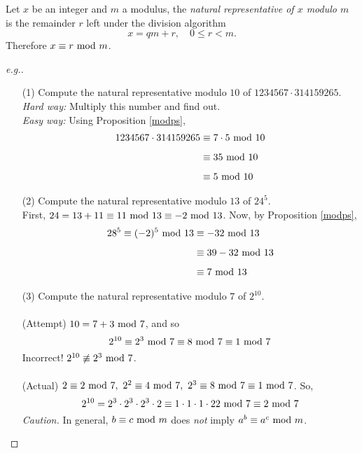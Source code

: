 \begin{definition}
Let $x$ be an integer and $m$ a modulus, the \emph{natural representative of $x$ modulo $m$} is the remainder $r$ left under the division algorithm
\[x = qm + r,\quad 0 \leq r < m.\]
Therefore $x \equiv r\text{ mod }{m}$.
\end{definition}
\begin{proof}[e.g.]\renewcommand{\qedsymbol}{}
\begin{itemize}
\item[(1)] Compute the natural representative modulo $10$ of $1234567 \cdot 314159265$.\\[0.5em]
\hspace*{1.9em}\emph{Hard way:} Multiply this number and find out.\\[0.5em]
\hspace*{1.9em}\emph{Easy way:} Using Proposition \ref{modps},
\begin{align*}
1234567 \cdot 314159265 &\equiv 7\cdot 5\text{ mod }{10}\\[0.5em]
&\equiv 35\text{ mod }{10}\\[0.5em]
&\equiv 5\text{ mod }{10}
\end{align*}
\end{itemize}
\begin{itemize}[leftmargin=4.4em]
\item[(2)] Compute the natural representative modulo $13$ of $24^5$.\\[0.5em]
First, $24 = 13 + 11 \equiv 11\text{ mod }{13} \equiv -2\text{ mod }{13}$. Now, by Proposition \ref{modps},
\begin{align*}
28^5 \equiv (-2)^5\text{ mod }{13} &\equiv -32\text{ mod }{13}\\[0.5em]
&\equiv 39 - 32\text{ mod }{13}\\[0.5em]
&\equiv 7\text{ mod }{13}
\end{align*}
\item[(3)] Compute the natural representative modulo $7$ of $2^{10}$.\\
\\
(Attempt) $10 = 7 + 3\text{ mod }{7}$, and so
\[2^{10} \equiv 2^3\text{ mod }{7} \equiv 8\text{ mod }{7} \equiv 1\text{ mod }{7}\]
Incorrect! $2^{10} \not\equiv 2^3\text{ mod }{7}$.\\
\\
(Actual) $2\equiv 2\text{ mod }{7},\ 2^2\equiv 4\text{ mod }{7},\ 2^3\equiv 8\text{ mod }{7}\equiv 1\text{ mod }{7}$. So, 
\[2^{10} = 2^3\cdot 2^3\cdot 2^3\cdot 2\equiv 1\cdot 1\cdot 1\cdot 2 2\text{ mod }{7}\equiv 2\text{ mod }{7}\]
\emph{Caution.} In general, $b \equiv c\text{ mod }{m}$ does \emph{not} imply $a^b\equiv a^c\text{ mod }{m}$.
\end{itemize}
\end{proof}

